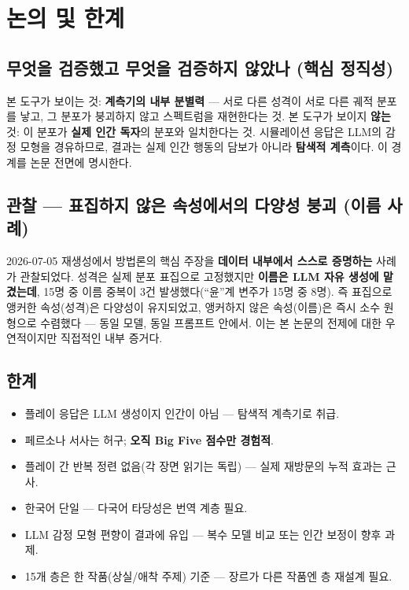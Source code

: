 \documentclass[11pt, a4paper]{article}
\begin{document}
\section{논의 및 한계}

\subsection{무엇을 검증했고 무엇을 검증하지 않았나 (핵심 정직성)}

본 도구가 보이는 것: \textbf{계측기의 내부 분별력} --- 서로 다른 성격이 서로 다른 궤적 분포를 낳고, 그 분포가 붕괴하지 않고 스펙트럼을 재현한다는 것. 본 도구가 보이지 \textbf{않는} 것: 이 분포가 \textbf{실제 인간 독자}의 분포와 일치한다는 것. 시뮬레이션 응답은 LLM의 감정 모형을 경유하므로, 결과는 실제 인간 행동의 담보가 아니라 \textbf{탐색적 계측}이다. 이 경계를 논문 전면에 명시한다.

\subsection{관찰 --- 표집하지 않은 속성에서의 다양성 붕괴 (이름 사례)}

2026-07-05 재생성에서 방법론의 핵심 주장을 \textbf{데이터 내부에서 스스로 증명하는} 사례가 관찰되었다. 성격은 실제 분포 표집으로 고정했지만 \textbf{이름은 LLM 자유 생성에 맡겼는데}, 15명 중 이름 중복이 3건 발생했다(``윤''계 변주가 15명 중 8명). 즉 표집으로 앵커한 속성(성격)은 다양성이 유지되었고, 앵커하지 않은 속성(이름)은 즉시 소수 원형으로 수렴했다 --- 동일 모델, 동일 프롬프트 안에서. 이는 본 논문의 전제에 대한 우연적이지만 직접적인 내부 증거다.

\subsection{한계}

\begin{itemize}
  \item 플레이 응답은 LLM 생성이지 인간이 아님 --- 탐색적 계측기로 취급.
  \item 페르소나 서사는 허구; \textbf{오직 Big Five 점수만 경험적}.
  \item 플레이 간 반복 정련 없음(각 장면 읽기는 독립) --- 실제 재방문의 누적 효과는 근사.
  \item 한국어 단일 --- 다국어 타당성은 번역 계층 필요.
  \item LLM 감정 모형 편향이 결과에 유입 --- 복수 모델 비교 또는 인간 보정이 향후 과제.
  \item 15개 층은 한 작품(상실/애착 주제) 기준 --- 장르가 다른 작품엔 층 재설계 필요.
\end{itemize}
\end{document}
